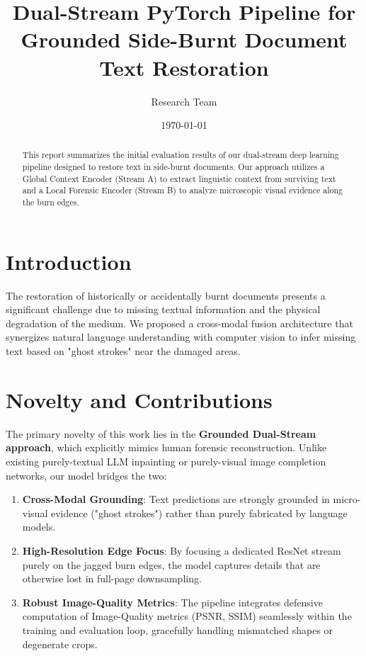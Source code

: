 \documentclass{article}
\title{Dual-Stream PyTorch Pipeline for Grounded Side-Burnt Document Text Restoration}
\author{Research Team}
\date{\today}
\begin{document}
\maketitle

\begin{abstract}
This report summarizes the initial evaluation results of our dual-stream deep learning pipeline designed to restore text in side-burnt documents. Our approach utilizes a Global Context Encoder (Stream A) to extract linguistic context from surviving text and a Local Forensic Encoder (Stream B) to analyze microscopic visual evidence along the burn edges.
\end{abstract}

\section{Introduction}
The restoration of historically or accidentally burnt documents presents a significant challenge due to missing textual information and the physical degradation of the medium. We proposed a cross-modal fusion architecture that synergizes natural language understanding with computer vision to infer missing text based on "ghost strokes" near the damaged areas.

\section{Novelty and Contributions}
The primary novelty of this work lies in the \textbf{Grounded Dual-Stream approach}, which explicitly mimics human forensic reconstruction. Unlike existing purely-textual LLM inpainting or purely-visual image completion networks, our model bridges the two:
\begin{enumerate}
    \item \textbf{Cross-Modal Grounding}: Text predictions are strongly grounded in micro-visual evidence ("ghost strokes") rather than purely fabricated by language models.
    \item \textbf{High-Resolution Edge Focus}: By focusing a dedicated ResNet stream purely on the jagged burn edges, the model captures details that are otherwise lost in full-page downsampling.
    \item \textbf{Robust Image-Quality Metrics}: The pipeline integrates defensive computation of Image-Quality metrics (PSNR, SSIM) seamlessly within the training and evaluation loop, gracefully handling mismatched shapes or degenerate crops.
\end{enumerate}
\end{document}
